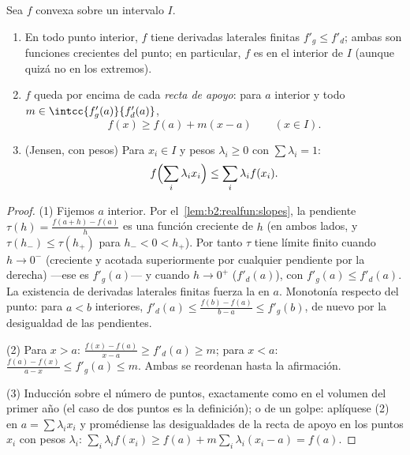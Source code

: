 \begin{theorem}\label{thm:b2:realfun:convexreg}
Sea $f$ convexa sobre un intervalo $I$.
\begin{enumerate}
  \item En todo punto interior, $f$ tiene derivadas laterales finitas
        $f'_g \leq f'_d$; ambas son funciones crecientes del punto; en
        particular, $f$ es  en el interior de $I$ (aunque
        quizá no en los extremos).
  \item $f$ queda por encima de cada \emph{recta de apoyo}: para $a$
        interior y todo $m \in \intcc{f'_g(a)}{f'_d(a)}$,
        \[
        f(x) \geq f(a) + m(x - a) \qquad (x \in I).
        \]
  \item (Jensen, con pesos) Para $x_i \in I$ y pesos $\lambda_i \geq
        0$ con $\sum\lambda_i = 1$:
        \[
        f\Bigl(\sum_i \lambda_i x_i\Bigr) \leq \sum_i \lambda_i
        f(x_i) .\index{desigualdad de Jensen}
        \]
\end{enumerate}
\end{theorem}

\begin{proof}
(1) Fijemos $a$ interior. Por el~\cref{lem:b2:realfun:slopes}, la
pendiente $\tau(h) = \frac{f(a + h) - f(a)}{h}$ es una función
creciente de $h$ (en ambos lados, y $\tau(h_-) \leq \tau(h_+)$ para
$h_- < 0 < h_+$). Por tanto $\tau$ tiene límite finito cuando $h \to
0^-$ (creciente y acotada superiormente por cualquier pendiente por
la derecha) ---ese es $f'_g(a)$--- y cuando $h \to 0^+$ ($f'_d(a)$),
con $f'_g(a) \leq f'_d(a)$. La existencia de derivadas laterales
finitas fuerza la  en $a$. Monotonía respecto del punto:
para $a < b$ interiores, $f'_d(a) \leq \frac{f(b) - f(a)}{b - a}
\leq f'_g(b)$, de nuevo por la desigualdad de las pendientes.

(2) Para $x > a$: $\frac{f(x) - f(a)}{x - a} \geq f'_d(a) \geq m$;
para $x < a$: $\frac{f(a) - f(x)}{a - x} \leq f'_g(a) \leq m$. Ambas
se reordenan hasta la afirmación.

(3) Inducción sobre el número de puntos, exactamente como en el
volumen del primer año (el caso de dos puntos es la definición); o
de un golpe: aplíquese (2) en $a = \sum\lambda_i x_i$ y promédiense
las desigualdades de la recta de apoyo en los puntos $x_i$ con pesos
$\lambda_i$: $\sum_i \lambda_i f(x_i) \geq f(a) +
m\sum_i\lambda_i(x_i - a) = f(a)$.
\end{proof}

